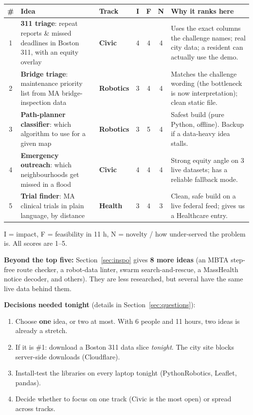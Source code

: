 \documentclass[11pt]{article}
\newcommand{\tagC}{\textcolor{civic}{\textbf{Civic}}}
\newcommand{\tagR}{\textcolor{robo}{\textbf{Robotics}}}
\newcommand{\tagH}{\textcolor{health}{\textbf{Health}}}
\begin{document}
\begin{longtable}{@{}c L{5.2cm} L{1.7cm} c c c L{6.0cm}@{}}
\toprule
\textbf{\#} & \textbf{Idea} & \textbf{Track} & \textbf{I} & \textbf{F} & \textbf{N} & \textbf{Why it ranks here}\\
\midrule
{} & \textbf{311 triage}: repeat reports \& missed deadlines in Boston 311, with an equity overlay & \tagC & 4 & 4 & 4 & Uses the exact columns the challenge names; real city data; a resident can actually use the demo.\\
2 & \textbf{Bridge triage}: maintenance priority list from MA bridge-inspection data & \tagR & 3 & 4 & 4 & Matches the challenge wording (the bottleneck is now interpretation); clean static file.\\
3 & \textbf{Path-planner classifier}: which algorithm to use for a given map & \tagR & 3 & 5 & 4 & Safest build (pure Python, offline). Backup if a data-heavy idea stalls.\\
4 & \textbf{Emergency outreach}: which neighbourhoods get missed in a flood & \tagC & 4 & 4 & 4 & Strong equity angle on 3 live datasets; has a reliable fallback mode.\\
5 & \textbf{Trial finder}: MA clinical trials in plain language, by distance & \tagH & 3 & 4 & 3 & Clean, safe build on a live federal feed; gives us a Healthcare entry.\\
\bottomrule
\end{longtable}

{\small I = impact, F = feasibility in 11 h, N = novelty / how under-served the problem is. All scores are 1--5.}

\textbf{Beyond the top five:} Section~\ref{sec:inspo} gives \textbf{8 more ideas} (an MBTA step-free route checker, a robot-data linter, swarm search-and-rescue, a MassHealth notice decoder, and others). They are less researched, but several have the same live data behind them.

\textbf{Decisions needed tonight} (details in Section~\ref{sec:questions}):
\begin{enumerate}
\item Choose \textbf{one} idea, or two at most. With 6 people and 11 hours, two ideas is already a stretch.
\item If it is \#1: download a Boston 311 data slice \emph{tonight}. The city site blocks
  server-side downloads (Cloudflare).
\item Install-test the libraries on every laptop tonight (PythonRobotics, Leaflet, pandas).
\item Decide whether to focus on one track (Civic is the most open) or spread across tracks.
\end{enumerate}
\end{document}
